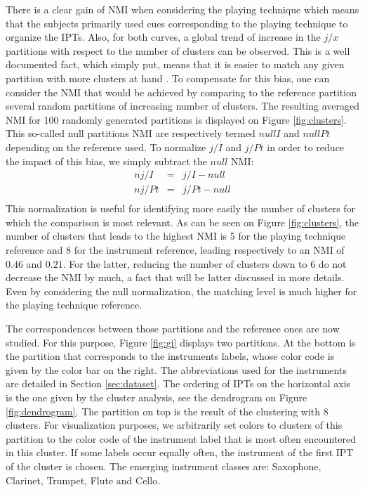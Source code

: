 \documentclass{article}
\newcommand{\ipt}{IPT\xspace}
\newcommand{\ipts}{IPTs\xspace}
\begin{document}
There is a clear gain of NMI when considering the playing technique which means that the subjects primarily used cues corresponding to the playing technique to organize the \ipts. Also, for both curves, a global trend of increase in the $j/x$ partitions with respect to the number of clusters can be observed. This is a well documented fact, which simply put, means that it is easier to match any given partition with more clusters at hand \cite{tibshirani2001estimating}. To compensate for this bias, one can consider the NMI that would be achieved by comparing to the reference partition several random partitions of increasing number of clusters. The resulting averaged NMI for 100 randomly generated partitions is displayed on Figure \ref{fig:clusters}. This so-called null partitions NMI are respectively termed $nullI$ and $nullPt$ depending on the reference used. To normalize $j/I$ and $j/Pt$ in order to reduce the impact of this bias, we simply subtract the $null$ NMI:
\begin{eqnarray}
  nj/I &=& j/I - null \\
  nj/Pt &=& j/Pt - null  \\
\end{eqnarray}
This normalization is useful for identifying more easily the number of clusters for which the comparison is most relevant. As can be seen on Figure \ref{fig:clusters}, the number of clusters that leads to the highest NMI is 5 for the playing technique reference and 8 for the instrument reference, leading respectively to an NMI of $0.46$ and $0.21$. For the latter, reducing the number of clusters down to 6 do not decrease the NMI by much, a fact that will be latter discussed in more details. Even by considering the null normalization, the matching level is much higher for the playing technique reference.

The correspondences between those partitions and the reference ones are now studied. For this purpose, Figure \ref{fig:gi} displays two partitions. At the bottom is the partition that corresponds to the instruments labels, whose color code is given by the color bar on the right. The abbreviations used for the instruments are detailed in Section \ref{sec:dataset}. The ordering of \ipts on the horizontal axis is the one given by the cluster analysis, see the dendrogram on Figure \ref{fig:dendrogram}. The partition on top is the result of the clustering with 8 clusters. For visualization purposes, we arbitrarily set colors to clusters of this partition to the color code of the instrument label that is most often encountered in this cluster. If some labels occur equally often, the instrument of the first \ipt of the cluster is chosen. The emerging instrument classes are: Saxophone, Clarinet, Trumpet, Flute and Cello.
\end{document}
